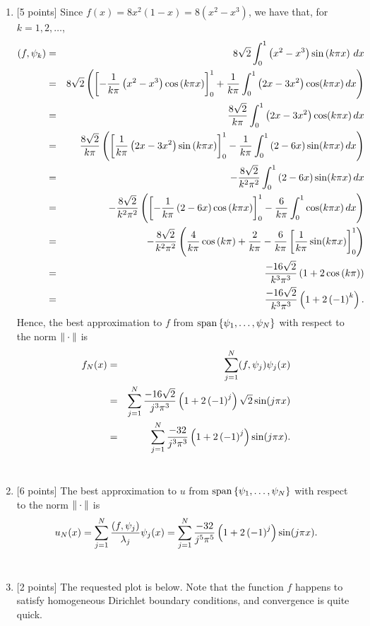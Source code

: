 \begin{solution}
\begin{enumerate}
\item {[5 points]} Since $f(x) = 8x^2(1-x) = 8\left(x^2-x^3\right)$, we have that, for $k=1,2,\ldots$,
\begin{eqnarray*}
(f,\psi_k)&=&8\sqrt{2}\int_0^1 \left(x^2-x^3\right) \sin\left(k\pi x\right)\, dx
\\
&=&8\sqrt{2}\left(\left[-{1\over k\pi}\left(x^2-x^3\right)\cos\left(k\pi x\right)\right]_0^1+{1\over k\pi}\int_0^1 \left(2x-3x^2\right) \cos(k\pi x)\, dx\right)
\\
&=&{8\sqrt{2}\over k\pi}\int_0^1 \left(2x-3x^2\right) \cos(k\pi x)\, dx
\\
&=&{8\sqrt{2}\over k\pi}\left(\left[{1\over k\pi}\left(2x-3x^2\right)\sin\left(k\pi x\right)\right]_0^1-{1\over k\pi}\int_0^1 \left(2-6x\right) \sin(k\pi x)\, dx\right)
\\
&=&-{8\sqrt{2}\over k^2\pi^2}\int_0^1 \left(2-6x\right) \sin(k\pi x)\, dx
\\
&=&-{8\sqrt{2}\over k^2\pi^2}\left(\left[-{1\over k\pi}\left(2-6x\right)\cos\left(k\pi x\right)\right]_0^1-{6\over k\pi}\int_0^1 \cos(k\pi x)\, dx\right)
\\
&=&-{8\sqrt{2}\over k^2\pi^2}\left({4\over k\pi}\cos\left(k\pi\right)+{2\over k\pi}-{6\over k\pi}\left[{1\over k\pi}\sin(k\pi x)\right]_0^1\right)
\\
&=&{-16\sqrt{2}\over k^3\pi^3}\left(1+2\cos\left(k\pi\right)\right)
\\
&=&{-16\sqrt{2}\over k^3\pi^3}\left(1+2\left(-1\right)^k\right).
\end{eqnarray*}
Hence, the best approximation to $f$ from ${\rm span}\left\{\psi_1,\ldots,\psi_N\right\}$ with respect to the norm $\|\cdot\|$ is
\begin{eqnarray*}
f_N(x)&=&\sum_{j=1}^N(f,\psi_j)\psi_j(x)
\\
&=&\sum_{j=1}^N{-16\sqrt{2}\over j^3\pi^3}\left(1+2\left(-1\right)^j\right)\sqrt{2}\sin(j\pi x)
\\
&=&\sum_{j=1}^N{-32\over j^3\pi^3}\left(1+2\left(-1\right)^j\right)\sin(j\pi x).
\end{eqnarray*}
\\
\item {[6 points]} The best approximation to $u$ from ${\rm span}\left\{\psi_1,\ldots,\psi_N\right\}$ with respect to the norm $\|\cdot\|$ is
\[
u_N(x)=\sum_{j=1}^N{(f,\psi_j) \over \lambda_j}\psi_j(x)=\sum_{j=1}^N{-32\over j^5\pi^5}\left(1+2\left(-1\right)^j\right)\sin(j\pi x).
\]
\\
\item {[2 points]} The requested plot is below. Note that the function $f$ happens to satisfy homogeneous Dirichlet boundary conditions, and convergence is quite quick.


\end{enumerate}
\end{solution}
